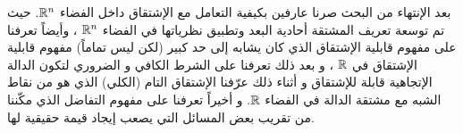 بعد الإنتهاء من البحث صرنا عارفين بكيفية التعامل مع الإشتقاق داخل الفضاء $\mathbb{R}^n$. حيث تم توسعة تعريف المشتقة أحادية البعد وتطبيق نظرياتها في الفضاء $\mathbb{R}^n$ ، وأيضاً تعرفنا على مفهوم قابلية الإشتقاق الذي كان يشابه إلى حد كبير (لكن ليس تماماً) مفهوم قابلية الإشتقاق في $\mathbb{R}$ ، و بعد ذلك تعرفنا على الشرط الكافي و الضروري لتكون الدالة الإتجاهية قابلة للإشتقاق و أثناء ذلك عرّفنا الإشتقاق التام (الكلي) الذي هو من نقاط الشبه مع مشتقة الدالة في الفضاء $\mathbb{R}$. و أخيراً تعرفنا على مفهوم التفاضل الذي مكّننا من تقريب بعض المسائل التي يصعب إيجاد قيمة حقيقية لها.